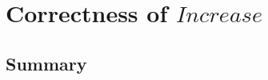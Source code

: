 \chapter[$Increase$]{Correctness of $Increase$}\label{ch15}

\newpage
\section{Summary}\label{ch15.summary}

\ldefsummary %
\lthmsummary %
\lthmaddeddefsummary %
\lthmaddedthmsummary %
\lzevessummary %
